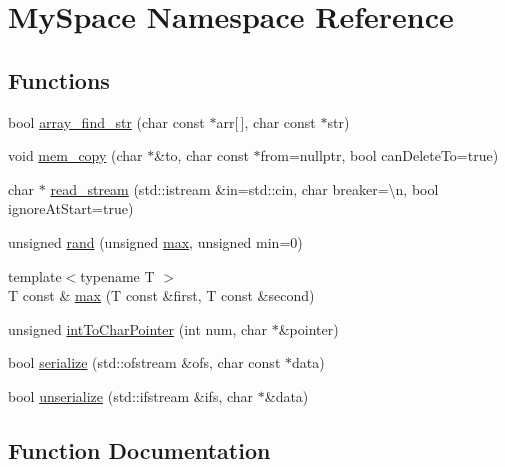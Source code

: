 \hypertarget{namespaceMySpace}{}\section{My\+Space Namespace Reference}
\label{namespaceMySpace}
\subsection*{Functions}
\begin{DoxyCompactItemize}
\item 
bool \hyperlink{namespaceMySpace_a3b9b473aea635657e0bb296a09912634}{array\+\_\+find\+\_\+str} (char const $\ast$arr\mbox{[}$\,$\mbox{]}, char const $\ast$str)
\item 
void \hyperlink{namespaceMySpace_af413b7b37194be22c25673cf245a89d3}{mem\+\_\+copy} (char $\ast$\&to, char const $\ast$from=nullptr, bool can\+Delete\+To=true)
\item 
char $\ast$ \hyperlink{namespaceMySpace_acfe71ee08c30cdafde43d7db1cd34aff}{read\+\_\+stream} (std\+::istream \&in=std\+::cin, char breaker=\textquotesingle{}\textbackslash{}n\textquotesingle{}, bool ignore\+At\+Start=true)
\item 
unsigned \hyperlink{namespaceMySpace_af98f3ea3e2a0dbabf65f65c74c015830}{rand} (unsigned \hyperlink{namespaceMySpace_a8a8164e21fbd934574e90bcbb473244e}{max}, unsigned min=0)
\item 
{\footnotesize template$<$typename T $>$ }\\T const  \& \hyperlink{namespaceMySpace_a8a8164e21fbd934574e90bcbb473244e}{max} (T const \&first, T const \&second)
\item 
unsigned \hyperlink{namespaceMySpace_a1e7c3c88bd9a9409c2165151610c0181}{int\+To\+Char\+Pointer} (int num, char $\ast$\&pointer)
\item 
bool \hyperlink{namespaceMySpace_ad2ec85a91c9b7fb281271a88f0ce9ef4}{serialize} (std\+::ofstream \&ofs, char const $\ast$data)
\item 
bool \hyperlink{namespaceMySpace_a99c49bdb6efc496c35e1e3ca0167da2b}{unserialize} (std\+::ifstream \&ifs, char $\ast$\&data)
\end{DoxyCompactItemize}


\subsection{Function Documentation}
\mbox{\label{namespaceMySpace_a3b9b473aea635657e0bb296a09912634}} 
